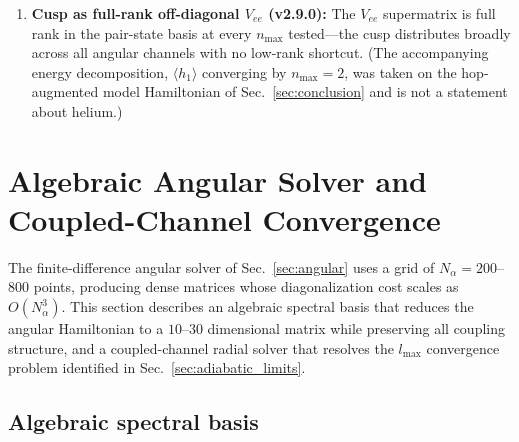 \documentclass[aps,pra,twocolumn,superscriptaddress,longbibliography]{revtex4-2}
\begin{document}
\begin{enumerate}
    physical Hamiltonian at $n_{\max} \ge 2$ ($E = -0.5162$~Ha at
    $n_{\max}=5$, $2.2\%$ above the exact $-0.52775$~Ha, variational).
    \textbf{[CORRECTED 2026-09-25]} An earlier version reported H$^-$
    ``over-bound by 21\%'' below a ``graph-validity boundary'' [retracted 2026-09-25: he-graph-native-hop-headline]
    $Z_c \approx 1.84$.  Both belonged to the non-physical one-body
    graph hop discussed in Sec.~\ref{sec:conclusion}, not to H$^-$:\
    with the hop the energy falls below the exact value for
    $Z \lesssim 1.8$--$1.9$ (the crossing drifts with $n_{\max}$), and
    without it the calculation is variational at every $Z$.
  \item \textbf{Cusp as full-rank off-diagonal $V_{ee}$ (v2.9.0):}
    The $V_{ee}$ supermatrix is full rank in the pair-state basis at
    every $n_{\max}$ tested---the cusp distributes broadly across all
    angular channels with no low-rank shortcut.  (The accompanying
    energy decomposition, $\langle h_1 \rangle$ converging by
    $n_{\max}=2$, was taken on the hop-augmented model Hamiltonian of
    Sec.~\ref{sec:conclusion} and is not a statement about helium.)
\end{enumerate}


\section{Algebraic Angular Solver and Coupled-Channel Convergence}
\label{sec:algebraic_angular}

The finite-difference angular solver of Sec.~\ref{sec:angular} uses
a grid of $N_\alpha = 200$--$800$ points, producing dense matrices
whose diagonalization cost scales as $O(N_\alpha^3)$.  This section
describes an algebraic spectral basis that reduces the angular
Hamiltonian to a $10$--$30$ dimensional matrix while preserving
all coupling structure, and a coupled-channel radial solver that
resolves the $l_{\max}$ convergence problem identified in
Sec.~\ref{sec:adiabatic_limits}.

\subsection{Algebraic spectral basis}
\label{sec:spectral_basis}
\end{document}
